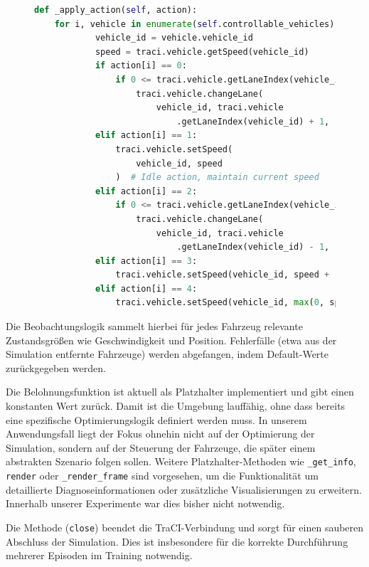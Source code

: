 \begin{figure}[ht]
\begin{lstlisting}[language=Python, caption=apply\_action Implementierung, label={lst:applyAction}, basicstyle=\ttfamily\small]
def _apply_action(self, action):
    for i, vehicle in enumerate(self.controllable_vehicles):
            vehicle_id = vehicle.vehicle_id
            speed = traci.vehicle.getSpeed(vehicle_id)
            if action[i] == 0:
                if 0 <= traci.vehicle.getLaneIndex(vehicle_id) + 1 < 3:
                    traci.vehicle.changeLane(
                        vehicle_id, traci.vehicle
                            .getLaneIndex(vehicle_id) + 1, 1)
            elif action[i] == 1:
                traci.vehicle.setSpeed(
                    vehicle_id, speed
                )  # Idle action, maintain current speed
            elif action[i] == 2:
                if 0 <= traci.vehicle.getLaneIndex(vehicle_id) - 1 < 3:
                    traci.vehicle.changeLane(
                        vehicle_id, traci.vehicle
                            .getLaneIndex(vehicle_id) - 1, 1)
            elif action[i] == 3:
                traci.vehicle.setSpeed(vehicle_id, speed + 1)
            elif action[i] == 4:
                traci.vehicle.setSpeed(vehicle_id, max(0, speed - 1))
\end{lstlisting}
\end{figure}
Die Beobachtungslogik sammelt hierbei für jedes Fahrzeug relevante Zustandsgrößen wie Geschwindigkeit und Position. Fehlerfälle (etwa aus der Simulation entfernte Fahrzeuge) werden abgefangen, indem Default-Werte zurückgegeben werden.

Die Belohnungsfunktion ist aktuell als Platzhalter implementiert und gibt einen konstanten Wert zurück. Damit ist die Umgebung lauffähig, ohne dass bereits eine spezifische Optimierungslogik definiert werden muss. In unserem Anwendungsfall liegt der Fokus ohnehin nicht auf der Optimierung der Simulation, sondern auf der Steuerung der Fahrzeuge, die später einem abstrakten Szenario folgen sollen. Weitere Platzhalter-Methoden wie \texttt{\_get\_info}, \texttt{render} oder \texttt{\_render\_frame} sind vorgesehen, um die Funktionalität um detaillierte Diagnoseinformationen oder zusätzliche Visualisierungen zu erweitern. Innerhalb unserer Experimente war dies bisher nicht notwendig.

Die Methode (\texttt{close}) beendet die TraCI-Verbindung und sorgt für einen sauberen Abschluss der Simulation. Dies ist insbesondere für die korrekte Durchführung mehrerer Episoden im Training notwendig.
